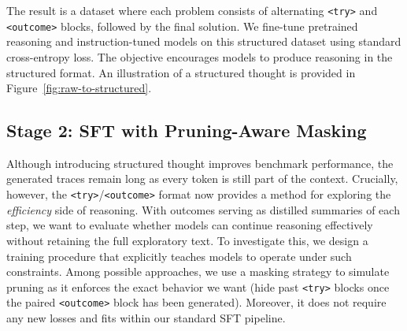 \documentclass{article}
\newcommand\dascomment[1]{\textcolor{orange}{das: \textit{#1}}}
\begin{document}
The result is a dataset where each problem consists of alternating \texttt{<try>} and \texttt{<outcome>} blocks, followed by the final solution.
We fine-tune pretrained reasoning and instruction-tuned models on this structured dataset using standard cross-entropy loss. The objective encourages models to produce reasoning in the structured format. An illustration of a structured thought is provided in Figure~\ref{fig:raw-to-structured}.


\subsection{Stage 2: SFT with Pruning-Aware Masking}
\label{subsec:masking_pruning}
Although introducing structured thought improves benchmark performance, the generated traces remain long as every token is still part of the context. Crucially, however, the \texttt{<try>}/\texttt{<outcome>} format now provides a method for exploring the \emph{efficiency} side of reasoning. With outcomes serving as distilled summaries of each step, we want to evaluate whether models can continue reasoning effectively without retaining the full exploratory text. To investigate this, we design a training procedure that explicitly teaches models to operate under such constraints. Among possible approaches, we use a masking strategy to simulate pruning as it enforces the exact behavior we want (hide past \texttt{<try>} blocks once the paired \texttt{<outcome>} block has been generated). Moreover, it does not require any new losses and fits within our standard SFT pipeline. 







\end{document}
